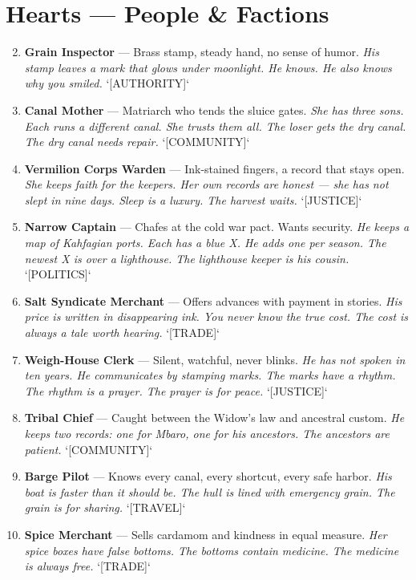 \section*{Hearts --- People \& Factions}
\label{sec:oshiira-people}
\begin{enumerate}
\setcounter{enumi}{1}
\item \textbf{Grain Inspector} --- Brass stamp, steady hand, no sense of humor.
  \hfill \textit{His stamp leaves a mark that glows under moonlight. He knows. He also knows why you smiled.} `[AUTHORITY]`
\item \textbf{Canal Mother} --- Matriarch who tends the sluice gates.
  \hfill \textit{She has three sons. Each runs a different canal. She trusts them all. The loser gets the dry canal. The dry canal needs repair.} `[COMMUNITY]`
\item \textbf{Vermilion Corps Warden} --- Ink-stained fingers, a record that stays open.
  \hfill \textit{She keeps faith for the keepers. Her own records are honest --- she has not slept in nine days. Sleep is a luxury. The harvest waits.} `[JUSTICE]`
\item \textbf{Narrow Captain} --- Chafes at the cold war pact. Wants security.
  \hfill \textit{He keeps a map of Kahfagian ports. Each has a blue X. He adds one per season. The newest X is over a lighthouse. The lighthouse keeper is his cousin.} `[POLITICS]`
\item \textbf{Salt Syndicate Merchant} --- Offers advances with payment in stories.
  \hfill \textit{His price is written in disappearing ink. You never know the true cost. The cost is always a tale worth hearing.} `[TRADE]`
\item \textbf{Weigh-House Clerk} --- Silent, watchful, never blinks.
  \hfill \textit{He has not spoken in ten years. He communicates by stamping marks. The marks have a rhythm. The rhythm is a prayer. The prayer is for peace.} `[JUSTICE]`
\item \textbf{Tribal Chief} --- Caught between the Widow's law and ancestral custom.
  \hfill \textit{He keeps two records: one for Mbaro, one for his ancestors. The ancestors are patient.} `[COMMUNITY]`
\item \textbf{Barge Pilot} --- Knows every canal, every shortcut, every safe harbor.
  \hfill \textit{His boat is faster than it should be. The hull is lined with emergency grain. The grain is for sharing.} `[TRAVEL]`
\item \textbf{Spice Merchant} --- Sells cardamom and kindness in equal measure.
  \hfill \textit{Her spice boxes have false bottoms. The bottoms contain medicine. The medicine is always free.} `[TRADE]`

\end{enumerate}
